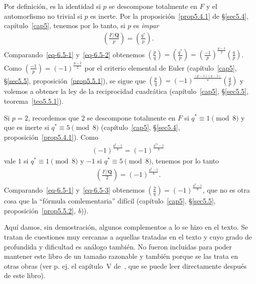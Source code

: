 \documentclass[oneside,bibtotoc,leqno,spanish]{amsbook}
\newcommand{\QQ}{\mathbf{Q}}
\numberwithin{equation}{section}
\theoremstyle{defi}
\theoremstyle{note}
\theoremstyle{rem}
\numberwithin{theorem}{section}
\numberwithin{proposition}{section}
\numberwithin{definition}{section}
\numberwithin{lemma}{section}
\numberwithin{corollary}{section}
\numberwithin{example}{section}
\numberwithin{footnote}{section}%
\begin{document}
Por definici\'on, es la identidad si $p$ se descompone totalmente en $F$ y el automorfismo no trivial si $p$
es inerte. Por la proposici\'on~\ref{prop5.4.1} de \S\ref{sec5.4}, cap\'itulo~\ref{cap5}, tenemos por lo tanto, si $p$ es {\em impar}
\begin{gather}\label{eq-6.5-2}
\left(\frac{F/\QQ}{p}\right) = \left(\frac{q^{*}}{p}\right).
\end{gather}
Comparando~\eqref{eq-6.5-1} y~\eqref{eq-6.5-2} obtenemos $\left(\frac{p}{q}\right)=\left(\frac{q^{*}}{p}\right)
=\left(\frac{-1}{p}\right)^{\frac{q-1}{2}}\left(\frac{q}{p}\right)$. Como $\left(\frac{-1}{p}\right)=(-1)^{\frac{p-2}{2}}$
por el criterio elemental de Euler (cap\'itulo~\ref{cap5}, \S\ref{sec5.5}, proposici\'on~\ref{prop5.5.1}), se sigue que $\left(\frac{p}{q}\right)
=(-1)^{\frac{(p-1)(q-1)}{4}}\left(\frac{q}{p}\right)$ y volemos a obtener la ley de la reciprocidad cuadr\'atica
(cap\'itulo~\ref{cap5}, \S\ref{sec5.5}, teorema~\ref{teo5.5.1}).

Si $p=2$, recordemos que $2$ se descompone totalmente en $F$ si $q^{*}\equiv 1\pmod 8$ y que es inerte
si $q^{*}\equiv 5\pmod 8$ (cap\'itulo~\ref{cap5}, \S\ref{sec5.4}, proposici\'on~\ref{prop5.4.1}). Como
\begin{gather*}
(-1)^{\frac{q^{2}-1}{8}}=(-1)^{\frac{q^{*2}-1}{8}}
\end{gather*}
vale $1$ si $q^{*}\equiv 1\pmod 8$ y $-1$ si $q^{*}\equiv 5\pmod 8$, tenemos por lo tanto
\begin{gather}\label{eq-6.5-3}
\left(\frac{F/\QQ}{2}\right)=(-1)^{\frac{q^{2}-1}{8}}.
\end{gather}
Comparando~\eqref{eq-6.5-1} y~\eqref{eq-6.5-3} obtenemos $\left(\frac{2}{q}\right) = (-1)^{\frac{q^{2}-1}{8}}$,
que no es otra cosa que la ``f\'ormula comlementaria'' dif\'icil (cap\'itulo~\ref{cap5}, \S\ref{sec5.5},
proposici\'on~\ref{prop5.5.2}, {\itshape b})).


\setcounter{equation}{0}

Aqu\'i damos, sin demostraci\'on, algunos complementos a lo se hizo en el texto. Se tratan de cuestiones
muy cercanas a aquellas tratadas en el texto y cuyo grado de profundida y dificultad es an\'alogo tambi\'en.
No fueron incluidas para poder mantener este libro de un tama\~no razonable y tambi\'en porque se las trata
en otras obras (ver p. ej. el cap\'itulo~V de~\cite{ZariskiSamuel}, que se puede leer directamente despu\'es de este
libro).
\end{document}
